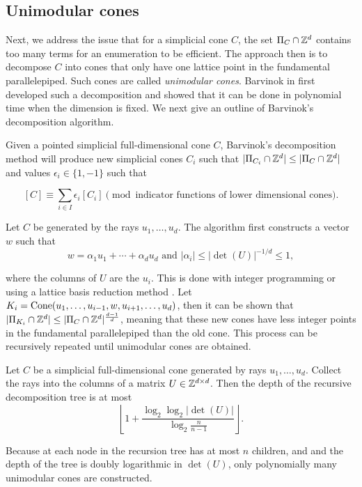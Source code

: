 \subsection{Unimodular cones}
Next, we address the issue that for a simplicial cone $C$, the set $\Pi_C \cap {\mathbb Z}^d$ contains too many terms for an enumeration to be efficient. The approach then is to decompose $C$ into cones that only have one lattice point in the fundamental parallelepiped. Such cones are called \emph{unimodular cones}. Barvinok in \cite{bar} first developed such a decomposition and showed that it can be done in polynomial time when the dimension is fixed. We next give an outline of Barvinok's decomposition algorithm. 

Given a pointed simplicial full-dimensional cone $C$, Barvinok's decomposition method will produce new simplicial cones $C_i$ such that $|\Pi_{C_i} \cap {\mathbb Z}^d| \leq |\Pi_{C} \cap {\mathbb Z}^d|$ and values $\epsilon_i \in \{1, -1\}$ such that

\[ [C] \equiv \sum_{i \in I} \epsilon_i [C_i] \pmod{\text{indicator functions of lower dimensional cones}}.\]

Let $C$ be generated by the rays $u_1, \dots, u_d$. The algorithm first constructs a vector $w$ such that
 \[w = \alpha_1 u_1 + \cdots + \alpha_d u_d \text{ and } |\alpha_i| \leq |\det(U)|^{-1/d} \leq 1,\]
 
 where the columns of $U$ are the $u_i$. This is done with integer programming or using a lattice basis reduction method \cite{latte1}. Let $K_i = \operatorname{Cone}(u_1, \dots, u_{i-1}, w, u_{i+1}, \dots, u_d)$, then it can be shown that $|\Pi_{K_i} \cap {\mathbb Z}^d| \leq |\Pi_{C} \cap {\mathbb Z}^d|^{\frac{d-1}{d}}$, meaning that these new cones have less integer points in the fundamental parallelepiped than the old cone. This process can be recursively repeated until unimodular cones are obtained. 
 
\begin{theorem}
Let $C$ be a simplicial full-dimensional cone generated by rays $u_1, \dots, u_d$. Collect the rays into the columns of a matrix $U \in {\mathbb Z}^{d \times d}$. Then the depth of the recursive decomposition tree is at most 
\[ \left\lfloor 1 + \frac{\log_2 \log_2 |\det(U)|}{\log_2 \frac{n}{n-1}} \right\rfloor. \]
\end{theorem}

Because at each node in the recursion tree has at most $n$ children, and and the depth of the tree is doubly logarithmic in $\det(U)$, only polynomially many unimodular cones are constructed. 

